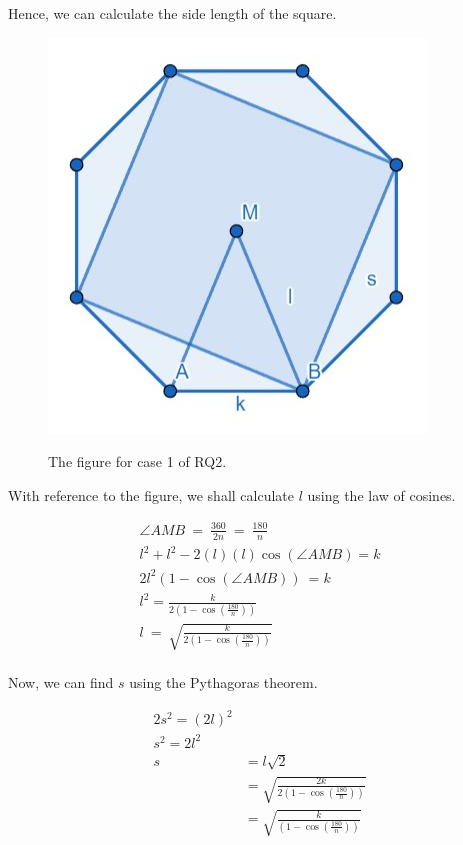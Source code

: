\documentclass[12pt]{scrartcl}
\begin{document}
Hence, we can calculate the side length of the square.

\begin{figure}[htpb]
	\centering
	\includegraphics[scale=.75]{images/rq2_1_2.jpg}
	\label{fig:rq2_1_2_img}
	\caption{The figure for case 1 of RQ2.}
\end{figure}

With reference to the figure, we shall calculate $l$ using the law of cosines.

\begin{align*}
	\angle AMB\ =\ \frac{360}{2n}\ =\ \frac{180}{n}     \\
	l^{2}+l^{2}-2\left(l\right)\left(l\right)\cos\left(\angle AMB\right)=k    \\
	2l^{2}\left(1-\cos\left(\angle AMB\right)\right)\ =k           \\
	l^{2}=\frac{k}{2\left(1-\cos\left(\frac{180}{n}\right)\right)}   \\
	l\ =\ \sqrt{\frac{k}{2\left(1-\cos\left(\frac{180}{n}\right)\right)}}    \\
\end{align*}

Now, we can find $s$ using the Pythagoras theorem.

\begin{align*}
  2s^{2}=\left(2l\right)^{2}    \\
	s^{2}=2l^{2}   \\
	s & = l\sqrt{2}    \\
	& = \sqrt{\frac{2k}{2\left(1-\cos\left(\frac{180}{n}\right)\right)}} \\
	& = \sqrt{\frac{k}{\left(1-\cos\left(\frac{180}{n}\right)\right)}} \\
\end{align*}

\printbibliography
\end{document}

